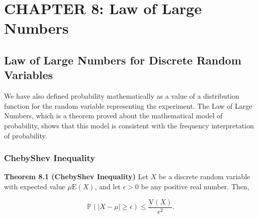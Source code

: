 \documentclass[12pt]{article}
\newcommand{\prob}[1]{\mathbb{P}(#1)}
\newcommand{\expected}[1]{\text{E}(#1)}
\newcommand{\variance}[1]{\text{V}(#1)}
\begin{document}

\section*{CHAPTER 8: Law of Large Numbers}
\subsection*{Law of Large Numbers for Discrete Random Variables}
\noindent
We have also defined probability mathematically as a value of a distribution function for the random variable representing the experiment. The Law of Large Numbers, which is a theorem proved about the mathematical model of probability, shows that this model is consistent with the frequency interpretation of  probability.

\subsubsection*{ChebyShev Inequality}
\noindent
\textbf{Theorem 8.1 (ChebyShev Inequality)} Let $X$ be a discrete random variable with expected value $\mu \expected{X}$, and let $\epsilon > 0$ be any positive real number. Then,

\begin{equation*}
\prob{\lvert X - \mu \rvert \geq \epsilon} \leq \frac{\variance{X}}{\epsilon^2}.
\end{equation*}
\end{document}
